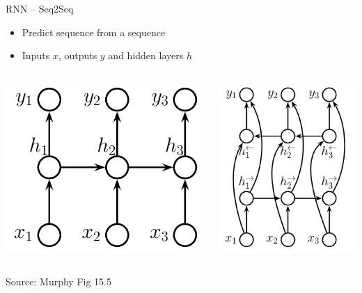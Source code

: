 \documentclass[ignorenonframetext,xcolor=x11names]{beamer}
\begin{document}
\begin{frame}{RNN -- Seq2Seq}
\begin{itemize}
    \item Predict sequence from a sequence
    \item Inputs $x$, outputs $y$ and hidden layers $h$
\end{itemize}
\centering
\begin{columns}
\begin{column}{.45\textwidth}
\centering

\includegraphics[width=.8\textwidth]{seq2seq.png} 
\end{column}
\begin{column}{.45\textwidth}
\centering

\includegraphics[width=.8\textwidth]{bidiseq2seq.png}
\end{column}
\end{columns}

\scriptsize Source: Murphy Fig 15.5
\end{frame}
\end{document}
